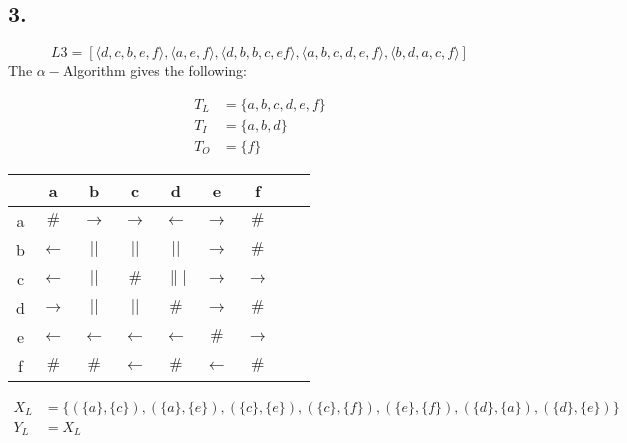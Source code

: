 \subsection*{3.}
\begin{equation*}
L3= [\langle d,c,b,e,f\rangle ,\langle a,e,f\rangle,\langle d,b,b,c,ef\rangle
,\langle a,b,c,d,e,f\rangle ,\langle b,d,a,c,f\rangle]
\end{equation*}
The $\alpha-$Algorithm gives the following:

\begin{align*}
T_L &= \{ a,b,c,d,e,f\}\\
T_I &= \{a,b,d\}\\
T_O &= \{f\}
\end{align*}
\begin{tabular}{c | c c c c c c c c}
	&a 	  		  &b 			 &c 			&d 	  			&e 			   &f	\\
	\hline
a	&$\#$ 		  &$\rightarrow$ &$\rightarrow$	&$\leftarrow$ 	&$\rightarrow$ &$\#$\\
b	&$\leftarrow$ &$||$			 &$||$ 			&$||$			&$\rightarrow$ &$\#$	\\
c	&$\leftarrow$ &$||$			 &$\#$			&$\||$  &$\rightarrow$ &$\rightarrow$\\
d	&$\rightarrow$&$||$  		 &$||$			&$\#$			&$\rightarrow$ &$\#$\\
e	&$\leftarrow$ &$\leftarrow$	 &$\leftarrow$	&$\leftarrow$	&$\#$
&$\rightarrow$\\
f	&$\#$ 		  &$\#$			 &$\leftarrow$			&$\#$	&$\leftarrow$  &$\#$	\\ 
\end{tabular}


\begin{align*}
X_L &= \{ (\{a\},\{c\}),(\{a\},\{e\})
,(\{c\},\{e\}),(\{c\},\{f\}),(\{e\},\{f\}),(\{d\},\{a\}),(\{d\},\{e\})\}\\
Y_L &= X_L\\
\end{align*}

